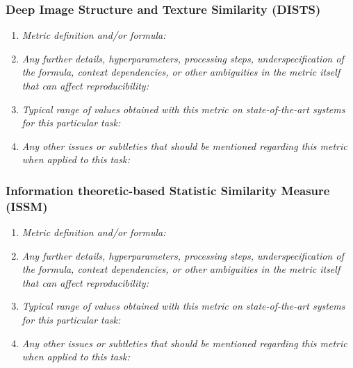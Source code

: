 \documentclass[a4paper,11pt]{article}
\begin{document}
        \subsubsection{Deep Image Structure and Texture Similarity (DISTS)}
            \begin{enumerate}[label=\alph*.]
                \item \textit{Metric definition and/or formula:}
                \bigskip
                \item \textit{Any further details, hyperparameters, processing steps, underspecification of the formula, context dependencies, or other ambiguities in the metric itself that can affect reproducibility:}
                \bigskip
                \item \textit{Typical range of values obtained with this metric on state-of-the-art systems for this particular task:}
                \bigskip
                \item \textit{Any other issues or subtleties that should be mentioned regarding this metric when applied to this task:}
                \bigskip
            \end{enumerate}
        \subsubsection{Information theoretic-based Statistic Similarity Measure (ISSM)}
            \begin{enumerate}[label=\alph*.]
                \item \textit{Metric definition and/or formula:}
                \bigskip
                \item \textit{Any further details, hyperparameters, processing steps, underspecification of the formula, context dependencies, or other ambiguities in the metric itself that can affect reproducibility:}
                \bigskip
                \item \textit{Typical range of values obtained with this metric on state-of-the-art systems for this particular task:}
                \bigskip
                \item \textit{Any other issues or subtleties that should be mentioned regarding this metric when applied to this task:}
                \bigskip
            \end{enumerate}
\end{document}
